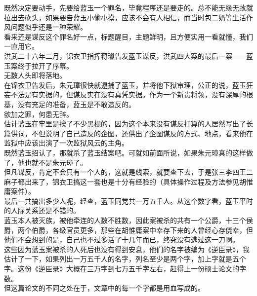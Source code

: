 \begin{multicols}{\theparacolNo}
既然决定要动手，先要给蓝玉一个罪名，毕竟程序还是要走的。总不能无缘无故就拉出去砍头，如果要告蓝玉小偷小摸，应该不会有人相信，而当时包二奶等生活作风问题似乎还是一种荣耀。\\

看来还是谋反这个罪名好一点，标题醒目，主题鲜明，且方便实用一看就懂，我们一直用它。\\

洪武二十六年二月，锦衣卫指挥蒋瓛告发蓝玉谋反，洪武四大案的最后一案——蓝玉案终于拉开了序幕。\\

无数人头即将落地。\\

在锦衣卫告发后，朱元璋很快就逮捕了蓝玉，并将他下狱审理，公正的说，蓝玉狂妄不法是有实据的，但谋反实在没有真凭实据。作为一个新贵将领，没有深厚的根基，没有充足的准备，蓝玉是不敢造反的。\\

欲加之罪，何患无辞。\\

估计蓝玉在牢里是挨了不少黑棍的，因为这个本来没有谋反打算的人居然写出了长篇供词，不但说明了自己造反的企图，还供出了企图谋反的方式、地点，看来他在监狱中应该出演了一次监狱风云的主角。\\

既然蓝玉招认了，那就杀了蓝玉结案吧。可就如前面所说，如果朱元璋真的这样做了，他也就不是朱元璋了。\\

但凡谋反，肯定不会只有一个人的，这就是线索，就要查下去，于是张三李四王二麻子都出来了，锦衣卫搞这一套也是十分有经验的（具体操作过程及方法参见胡惟庸案件）。\\

最后一共搞出多少人呢，经查，蓝玉同党共一万五千人。从这个数字看，蓝玉平时的人际关系还是不错的。\\

蓝玉本人被灭族，被他牵连的人数不胜数，因此案被杀的共有一个公爵，十三个侯爵，两个伯爵，各级官员更多，那些在胡惟庸案中幸存下来的人曾经心存侥幸，但他们不会想到的是，自己也不过多活了十几年而已，终究没有逃过这一刀啊。\\

这些因为蓝玉案被杀的人死后也没有得到安息，他们的名字被编为《逆臣录》，我估计了一下，如果列出一万五千人的名字，列名至少是两个字，加上字就是五个字。这份《逆臣录》大概在三万字到七万五千字左右，赶得上一份硕士论文的字数。\\

但这篇论文的不同之处在于，文章中的每一个字都是用血写成的。\\


\end{multicols}
